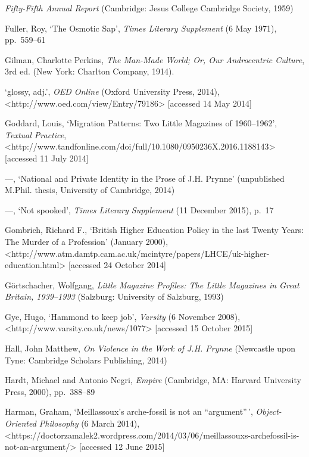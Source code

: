 \documentclass[]{article}
\begin{document}
\emph{Fifty-Fifth Annual Report} (Cambridge: Jesus College Cambridge
Society, 1959)

Fuller, Roy, `The Osmotic Sap', \emph{Times Literary Supplement} (6 May
1971), pp.~559--61

Gilman, Charlotte Perkins, \emph{The Man-Made World; Or, Our
Androcentric Culture}, 3rd ed. (New York: Charlton Company, 1914).

`glossy, adj.', \emph{OED Online} (Oxford University Press, 2014),\\
\textless{}http://www.oed.com/view/Entry/79186\textgreater{} {[}accessed
14 May 2014{]}

Goddard, Louis, `Migration Patterns: Two Little Magazines of
1960--1962', \emph{Textual Practice},\\
\textless{}http://www.tandfonline.com/doi/full/10.1080/0950236X.2016.1188143\textgreater{}
{[}accessed 11 July 2014{]}

---, `National and Private Identity in the Prose of J.H. Prynne'
(unpublished M.Phil. thesis, University of Cambridge, 2014)

---, `Not spooked', \emph{Times Literary Supplement} (11 December 2015),
p.~17

Gombrich, Richard F., `British Higher Education Policy in the last
Twenty Years: The Murder of a Profession' (January 2000),\\
\textless{}http://www.atm.damtp.cam.ac.uk/mcintyre/papers/LHCE/uk-higher-education.html\textgreater{}
{[}accessed 24 October 2014{]}

Görtschacher, Wolfgang, \emph{Little Magazine Profiles: The Little
Magazines in Great Britain, 1939--1993} (Salzburg: University of
Salzburg, 1993)

Gye, Hugo, `Hammond to keep job', \emph{Varsity} (6 November 2008),\\
\textless{}http://www.varsity.co.uk/news/1077\textgreater{} {[}accessed
15 October 2015{]}

Hall, John Matthew, \emph{On Violence in the Work of J.H. Prynne}
(Newcastle upon Tyne: Cambridge Scholars Publishing, 2014)

Hardt, Michael and Antonio Negri, \emph{Empire} (Cambridge, MA: Harvard
University Press, 2000), pp.~388--89

Harman, Graham, `Meillassoux's arche-fossil is not an ``argument''\,',
\emph{Object-Oriented Philosophy} (6 March 2014),\\
\textless{}https://doctorzamalek2.wordpress.com/2014/03/06/meillassouxs-archefossil-is-not-an-argument/\textgreater{}
{[}accessed 12 June 2015{]}
\end{document}
